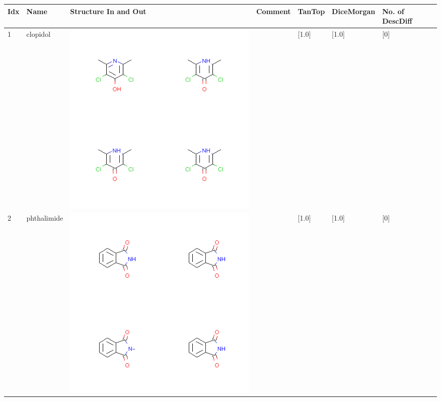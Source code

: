 \begin{longtable}{|l|l|l|l|l|l|l|}
\hline
Idx & Name & Structure In and Out & Comment & TanTop & DiceMorgan & No. of DescDiff\\
\hline
1 & clopidol & \includegraphics[scale=0.6]{clopidolMV.png} & & [1.0]& [1.0] & [0] \\
\hline
2 & phthalimide & \includegraphics[scale=0.6]{phthalimideMV.png} & & [1.0]& [1.0] & [0] \\
\hline

\end{longtable}
